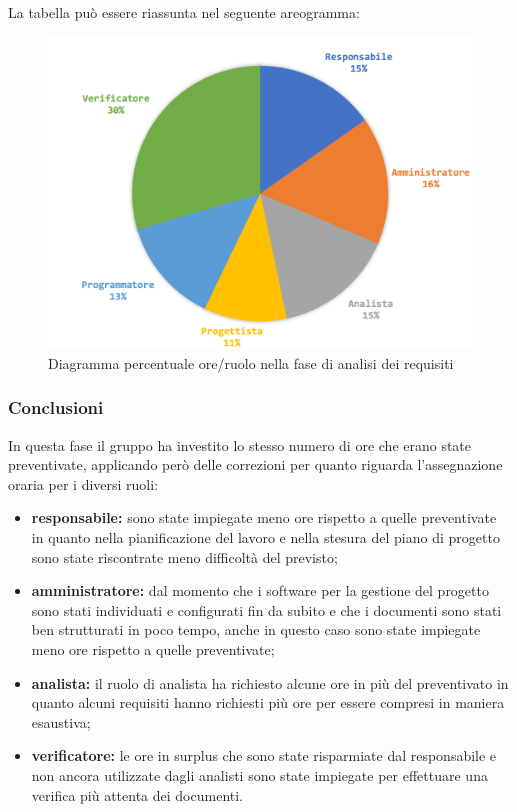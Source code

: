 			La tabella può essere riassunta nel seguente areogramma:
			\begin{figure}[H]
				\centering
				\includegraphics[width=0.8\linewidth]{images/consuntivo/analisiCons2.png}
				\caption{Diagramma percentuale ore/ruolo nella fase di analisi dei requisiti}
				\label{fig:consuntivo2 diagramma costi ruolo fase analisi dei requisiti}
			\end{figure}
		\subsubsection{Conclusioni}
			In questa fase il gruppo ha investito lo stesso numero di ore che erano state preventivate, applicando però delle correzioni per quanto riguarda l'assegnazione oraria per i diversi ruoli:
			\begin{itemize}
				\item \textbf{responsabile:} sono state impiegate meno ore rispetto a quelle preventivate in quanto nella pianificazione del lavoro e nella stesura del piano di progetto sono state riscontrate meno difficoltà del previsto;	 
				\item \textbf{amministratore:} dal momento che i software per la gestione del progetto sono stati individuati e configurati fin da subito e che i documenti sono stati ben strutturati in poco tempo, anche in questo caso sono state impiegate meno ore rispetto a quelle preventivate;
				\item \textbf{analista:} il ruolo di analista ha richiesto alcune ore in più del preventivato in quanto alcuni requisiti hanno richiesti più ore per essere compresi in maniera esaustiva;
				\item \textbf{verificatore:} le ore in surplus che sono state risparmiate dal responsabile e non ancora utilizzate dagli analisti sono state impiegate per effettuare una verifica più attenta dei documenti.  
			\end{itemize}
